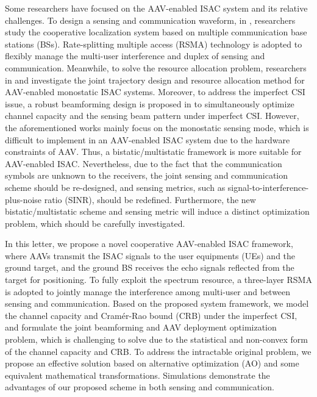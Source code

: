 \documentclass[twocolumn,journal]{IEEEtran}
\begin{document}
Some researchers have focused on the AAV-enabled ISAC system and its relative challenges. To design a sensing and communication waveform, in \cite{xuRateSplitting2021a}, researchers study the cooperative localization system based on multiple communication base stations (BSs). Rate-splitting multiple access (RSMA) technology is adopted to flexibly manage the multi-user interference and duplex of sensing and communication. Meanwhile, to solve the resource allocation problem, researchers in \cite{mengUAVEnabled2023} and \cite{jingISAC2024} investigate the joint trajectory design and resource allocation method for AAV-enabled monostatic ISAC systems. Moreover, to address the imperfect CSI issue, a robust beamforming design is proposed in \cite{lyuDualRobust2024} to simultaneously optimize channel capacity and the sensing beam pattern under imperfect CSI. However, the aforementioned works mainly focus on the monostatic sensing mode, which is difficult to implement in an AAV-enabled ISAC system due to the hardware constraints of AAV. Thus, a bistatic/multistatic framework is more suitable for AAV-enabled ISAC. Nevertheless, due to the fact that the communication symbols are unknown to the receivers, the joint sensing and communication scheme should be re-designed, and sensing metrics, such as signal-to-interference-plus-noise ratio (SINR), should be redefined. Furthermore, the new bistatic/multistatic scheme and sensing metric will induce a distinct optimization problem, which should be carefully investigated. 

In this letter, we propose a novel cooperative AAV-enabled ISAC framework, where AAVs transmit the ISAC signals to the user equipments (UEs) and the ground target, and the ground BS receives the echo signals reflected from the target for positioning. To fully exploit the spectrum resource, a three-layer RSMA is adopted to jointly manage the interference among multi-user and between sensing and communication. Based on the proposed system framework, we model the channel capacity and Cramér-Rao bound (CRB) under the imperfect CSI, and formulate the joint beamforming and AAV deployment optimization problem, which is challenging to solve due to the statistical and non-convex form of the channel capacity and CRB. To address the intractable original problem, we propose an effective solution based on alternative optimization (AO) and some equivalent mathematical transformations. Simulations demonstrate the advantages of our proposed scheme in both sensing and communication.
\end{document}
